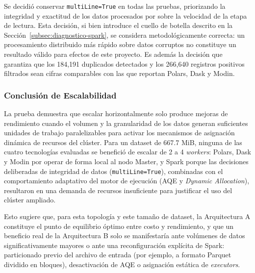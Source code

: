 Se decidió conservar \texttt{multiLine=True} en todas las pruebas, priorizando la integridad y exactitud de los datos procesados por sobre la velocidad de la etapa de lectura. Esta decisión, si bien introduce el cuello de botella descrito en la Sección~\ref{subsec:diagnostico-spark}, se considera metodológicamente correcta: un procesamiento distribuido más rápido sobre datos corruptos no constituye un resultado válido para efectos de este proyecto. Es además la decisión que garantiza que los 184,191 duplicados detectados y los 266,640 registros positivos filtrados sean cifras comparables con las que reportan Polars, Dask y Modin.

\subsubsection{Conclusión de Escalabilidad}

La prueba demuestra que escalar horizontalmente solo produce mejoras de rendimiento cuando el volumen y la granularidad de los datos generan suficientes unidades de trabajo paralelizables para activar los mecanismos de asignación dinámica de recursos del clúster. Para un dataset de 667.7 MiB, ninguna de las cuatro tecnologías evaluadas se benefició de escalar de 2 a 4 \textit{workers}: Polars, Dask y Modin por operar de forma local al nodo Master, y Spark porque las decisiones deliberadas de integridad de datos (\texttt{multiLine=True}), combinadas con el comportamiento adaptativo del motor de ejecución (AQE y \textit{Dynamic Allocation}), resultaron en una demanda de recursos insuficiente para justificar el uso del clúster ampliado.

Esto sugiere que, para esta topología y este tamaño de dataset, la Arquitectura A constituye el punto de equilibrio óptimo entre costo y rendimiento, y que un beneficio real de la Arquitectura B solo se manifestaría ante volúmenes de datos significativamente mayores o ante una reconfiguración explícita de Spark: particionado previo del archivo de entrada (por ejemplo, a formato Parquet dividido en bloques), desactivación de AQE o asignación estática de \textit{executors}.
